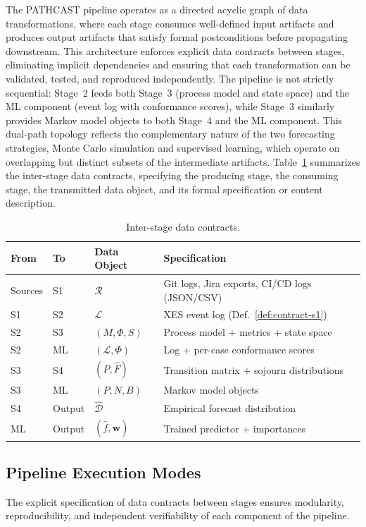 The PATHCAST pipeline operates as a directed acyclic graph of data
transformations, where each stage consumes well-defined input artifacts and
produces output artifacts that satisfy formal postconditions before
propagating downstream. This architecture enforces explicit data contracts
between stages, eliminating implicit dependencies and ensuring that each
transformation can be validated, tested, and reproduced independently. The
pipeline is not strictly sequential: Stage~2 feeds both Stage~3 (process
model and state space) and the ML component (event log with conformance
scores), while Stage~3 similarly provides Markov model objects to both
Stage~4 and the ML component. This dual-path topology reflects the
complementary nature of the two forecasting strategies, Monte Carlo
simulation and supervised learning, which operate on overlapping but
distinct subsets of the intermediate artifacts.
Table~\ref{tab:data-contracts} summarizes the inter-stage data contracts,
specifying the producing stage, the consuming stage, the transmitted data
object, and its formal specification or content description.

\begin{table}[htbp]
\centering
\caption{Inter-stage data contracts.}
\label{tab:data-contracts}
\small
\begin{tabular}{lllp{5cm}}
\toprule
\textbf{From} & \textbf{To} & \textbf{Data Object} & \textbf{Specification} \\
\midrule
Sources & S1 & $\mathcal{R}$ & Git logs, Jira exports, CI/CD logs (JSON/CSV) \\
S1 & S2 & $\mathcal{L}$ & XES event log (Def.~\ref{def:contract-s1}) \\
S2 & S3 & $(M, \Phi, S)$ & Process model + metrics + state space \\
S2 & ML & $(\mathcal{L}, \Phi)$ & Log + per-case conformance scores \\
S3 & S4 & $(P, \hat{F})$ & Transition matrix + sojourn distributions \\
S3 & ML & $(P, N, B)$ & Markov model objects \\
S4 & Output & $\hat{\mathcal{D}}$ & Empirical forecast distribution \\
ML & Output & $(\hat{f}, \mathbf{w})$ & Trained predictor + importances \\
\bottomrule
\end{tabular}
\end{table}


\subsection{Pipeline Execution Modes}
\label{sec:execution-modes}
The explicit specification of data contracts between stages ensures modularity, reproducibility, and independent verifiability of each component of the pipeline.

